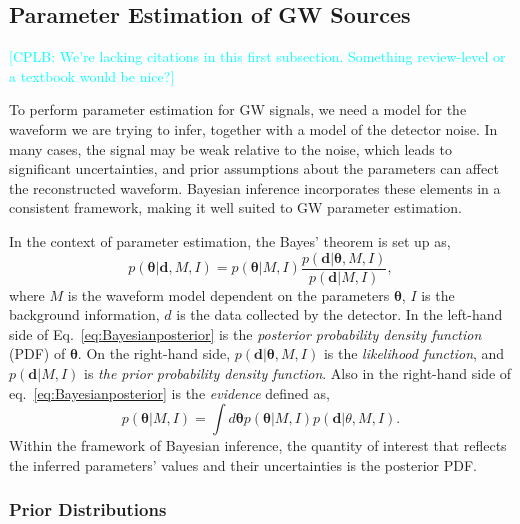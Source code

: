 \documentclass[a4paper,12pt]{article}
\newcommand{\cplb}[1]{\textcolor{cyan}{[CPLB: #1]}}
\begin{document}
\subsection{Parameter Estimation of GW Sources}
\label{subsec:ParamEstGWs}

\cplb{We're lacking citations in this first subsection. Something review-level or a textbook would be nice?}

To perform parameter estimation for GW signals, we need a model for the waveform we are trying to infer, together with a model of the detector noise. In many cases, the signal may be weak relative to the noise, which leads to significant uncertainties, and prior assumptions about the parameters can affect the reconstructed waveform. Bayesian inference incorporates these elements in a consistent framework, making it well suited to GW parameter estimation.

In the context of parameter estimation, the Bayes' theorem is set up as,
\begin{equation}    
p(\boldsymbol{\theta}|\mathbf{d},M,I) = p(\boldsymbol{\theta}|M,I)\frac{p(\mathbf{d}|\boldsymbol{\theta},M,I)}{p(\mathbf{d}|M,I)},
\label{eq:Bayesianposterior}
\end{equation}
where $M$ is the waveform model dependent on the parameters $\boldsymbol{\theta}$, $I$ is the background information, $d$ is the data collected by the detector. In the left-hand side of Eq.~\eqref{eq:Bayesianposterior} is the \textit{posterior probability density function} (PDF) of $\boldsymbol{\theta}$. On the right-hand side,  $p(\mathbf{d}|\boldsymbol{\theta},M,I)$ is the \textit{likelihood function}, and $p(\mathbf{d}|M,I)$ is \textit{the prior probability density function}. Also in the right-hand side of eq.~\eqref{eq:Bayesianposterior} is the \textit{evidence} defined as,
\begin{equation}    
p(\boldsymbol{\theta}|M,I) = \int d\boldsymbol{\theta} p(\boldsymbol{\theta}|M,I) p(\mathbf{d}|\theta,M,I).
\label{eq:evidence}
\end{equation}
Within the framework of Bayesian inference, the quantity of interest that reflects the inferred parameters' values and their uncertainties is the posterior PDF. 

\subsubsection{Prior Distributions}
\end{document}
